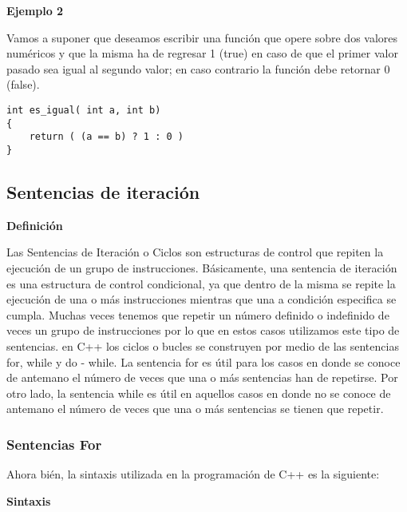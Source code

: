 \textbf{Ejemplo 2}

Vamos a suponer que deseamos escribir una función que opere sobre dos valores numéricos y que la misma ha de regresar 1 (true) en caso de que el primer valor pasado sea igual al segundo valor; en caso contrario la función debe retornar 0 (false).

\begin{lstlisting}[style=Cpp, label=condicional-ejemplo-2, caption=Condicional Ejemplo 2]
int es_igual( int a, int b)
{
    return ( (a == b) ? 1 : 0 )
}
\end{lstlisting}

\subsection{Sentencias de iteración}

\begin{center}
	\textbf{Definición}
\end{center}

Las Sentencias de Iteración o Ciclos son estructuras de control que repiten la ejecución de un grupo de instrucciones. Básicamente, una sentencia de iteración es una estructura de control condicional, ya que dentro de la misma se repite la ejecución de una o más instrucciones mientras que una a condición especifica se cumpla. Muchas veces tenemos que repetir un número definido o indefinido de veces un grupo de instrucciones por lo que en estos casos utilizamos este tipo de sentencias. en C++ los ciclos o bucles se construyen por medio de las sentencias for, while y do - while. La sentencia for es útil para los casos en donde se conoce de antemano el número de veces que una o más sentencias han de repetirse. Por otro lado, la sentencia while es útil en aquellos casos en donde no se conoce de antemano el número de veces que una o más sentencias se tienen que repetir.

\subsubsection{Sentencias For}

Ahora bién, la sintaxis utilizada en la programación de C++ es la siguiente:

\begin{center}
	\textbf{Sintaxis}
\end{center}

